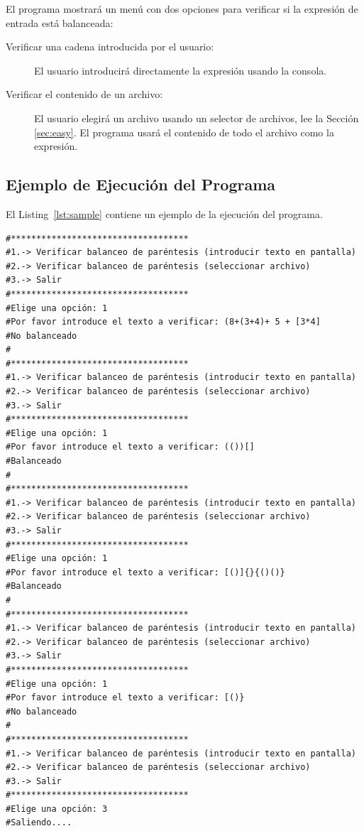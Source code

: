 \documentclass[10pt,a4paper]{article}
\begin{document}
El programa mostrará un menú con dos opciones para verificar si la expresión de entrada está balanceada:

\begin{description}
\item[Verificar una cadena introducida por el usuario: ] El usuario introducirá directamente la expresión usando la consola.
\item[Verificar el contenido de un archivo: ] El usuario elegirá un archivo usando un selector de archivos, lee la Sección \ref{sec:easy}. El programa usará el contenido de todo el archivo como la expresión.
\end{description}

\subsection{Ejemplo de Ejecución del Programa}

El Listing~\ref{lst:sample} contiene un ejemplo de la ejecución del programa.

\begin{lstlisting}[abovecaptionskip=0pt, caption={Ejemplo de ejecución del programa.}, label=lst:sample]
#***********************************
#1.-> Verificar balanceo de paréntesis (introducir texto en pantalla)
#2.-> Verificar balanceo de paréntesis (seleccionar archivo)
#3.-> Salir
#***********************************
#Elige una opción: 1
#Por favor introduce el texto a verificar: (8+(3+4)+ 5 + [3*4]
#No balanceado
#
#***********************************
#1.-> Verificar balanceo de paréntesis (introducir texto en pantalla)
#2.-> Verificar balanceo de paréntesis (seleccionar archivo)
#3.-> Salir
#***********************************
#Elige una opción: 1
#Por favor introduce el texto a verificar: (())[]
#Balanceado
#
#***********************************
#1.-> Verificar balanceo de paréntesis (introducir texto en pantalla)
#2.-> Verificar balanceo de paréntesis (seleccionar archivo)
#3.-> Salir
#***********************************
#Elige una opción: 1
#Por favor introduce el texto a verificar: [()]{}{()()}
#Balanceado
#
#***********************************
#1.-> Verificar balanceo de paréntesis (introducir texto en pantalla)
#2.-> Verificar balanceo de paréntesis (seleccionar archivo)
#3.-> Salir
#***********************************
#Elige una opción: 1
#Por favor introduce el texto a verificar: [()}
#No balanceado
#
#***********************************
#1.-> Verificar balanceo de paréntesis (introducir texto en pantalla)
#2.-> Verificar balanceo de paréntesis (seleccionar archivo)
#3.-> Salir
#***********************************
#Elige una opción: 3
#Saliendo....
\end{lstlisting}
\end{document}
